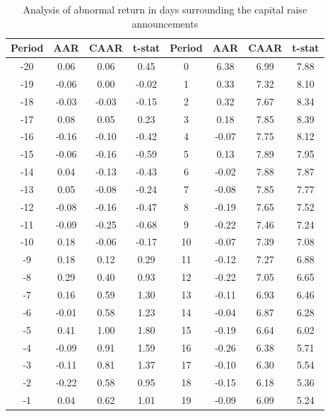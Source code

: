 \documentclass{beamer}
\begin{document}
	\begin{frame}
		
		
		\centering
		\begin{table}[htbp]
			\centering
			
			\captionsetup{labelformat=empty}
			\caption{\tiny Analysis of abnormal return in days surrounding the capital raise announcements}
			\centering
			\resizebox{0.8\textheight}{!}
			{\tiny
				\begin{tabular}{cccc|cccc}
					\hline\hline
					Period & \multicolumn{1}{c}{AAR} & \multicolumn{1}{c}{CAAR} & \multicolumn{1}{c}{t-stat} & Period & \multicolumn{1}{c}{AAR} & \multicolumn{1}{c}{CAAR} & \multicolumn{1}{c}{t-stat} \\
					\hline    -20   & 0.06  & 0.06  & 0.45  & 0     & 6.38  & 6.99  & 7.88 \\
					-19   & -0.06 & 0.00  & -0.02 & 1     & 0.33  & 7.32  & 8.10 \\
					-18   & -0.03 & -0.03 & -0.15 & 2     & 0.32  & 7.67  & 8.34 \\
					-17   & 0.08  & 0.05  & 0.23  & 3     & 0.18  & 7.85  & 8.39 \\
					-16   & -0.16 & -0.10 & -0.42 & 4     & -0.07 & 7.75  & 8.12 \\
					-15   & -0.06 & -0.16 & -0.59 & 5     & 0.13  & 7.89  & 7.95 \\
					-14   & 0.04  & -0.13 & -0.43 & 6     & -0.02 & 7.88  & 7.87 \\
					-13   & 0.05  & -0.08 & -0.24 & 7     & -0.08 & 7.85  & 7.77 \\
					-12   & -0.08 & -0.16 & -0.47 & 8     & -0.19 & 7.65  & 7.52 \\
					-11   & -0.09 & -0.25 & -0.68 & 9     & -0.22 & 7.46  & 7.24 \\
					-10   & 0.18  & -0.06 & -0.17 & 10    & -0.07 & 7.39  & 7.08 \\
					-9    & 0.18  & 0.12  & 0.29  & 11    & -0.12 & 7.27  & 6.88 \\
					-8    & 0.29  & 0.40  & 0.93  & 12    & -0.22 & 7.05  & 6.65 \\
					-7    & 0.16  & 0.59  & 1.30  & 13    & -0.11 & 6.93  & 6.46 \\
					-6    & -0.01 & 0.58  & 1.23  & 14    & -0.04 & 6.87  & 6.28 \\
					-5    & 0.41  & 1.00  & 1.80  & 15    & -0.19 & 6.64  & 6.02 \\
					-4    & -0.09 & 0.91  & 1.59  & 16    & -0.26 & 6.38  & 5.71 \\
					-3    & -0.11 & 0.81  & 1.37  & 17    & -0.10 & 6.30  & 5.54 \\
					-2    & -0.22 & 0.58  & 0.95  & 18    & -0.15 & 6.18  & 5.36 \\
					-1    & 0.04  & 0.62  & 1.01  & 19    & -0.09 & 6.09  & 5.24 \\
					\hline\hline
				\end{tabular}%
			}
		\end{table}%
		
	\end{frame}
\end{document}
